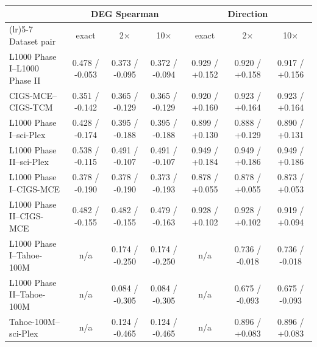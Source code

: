 \begin{table}[t]
\label{tab:dose_threshold_sensitivity}
\centering
\scriptsize
\renewcommand{\arraystretch}{1.15}
\setlength{\tabcolsep}{5pt}
\begin{tabular}{>{\raggedright\arraybackslash}p{3.4cm}@{\hspace{0.8pt}}cccccc}
\toprule
& \multicolumn{3}{c}{DEG Spearman} & \multicolumn{3}{c}{Direction} \\
\cmidrule(lr){2-4} \cmidrule(lr){5-7}
Dataset pair & exact & 2$\times$ & 10$\times$ & exact & 2$\times$ & 10$\times$ \\
\midrule
L1000 Phase I--L1000 Phase II
  & 0.478 / -0.053 & 0.373 / -0.095 & 0.372 / -0.094
  & 0.929 / +0.152 & 0.920 / +0.158 & 0.917 / +0.156 \\
CIGS-MCE--CIGS-TCM
  & 0.351 / -0.142 & 0.365 / -0.129 & 0.365 / -0.129
  & 0.920 / +0.160 & 0.923 / +0.164 & 0.923 / +0.164 \\
L1000 Phase I--sci-Plex
  & 0.428 / -0.174 & 0.395 / -0.188 & 0.395 / -0.188
  & 0.899 / +0.130 & 0.888 / +0.129 & 0.890 / +0.131 \\
L1000 Phase II--sci-Plex
  & 0.538 / -0.115 & 0.491 / -0.107 & 0.491 / -0.107
  & 0.949 / +0.184 & 0.949 / +0.186 & 0.949 / +0.186 \\
L1000 Phase I--CIGS-MCE
  & 0.378 / -0.190 & 0.378 / -0.190 & 0.373 / -0.193
  & 0.878 / +0.055 & 0.878 / +0.055 & 0.873 / +0.053 \\
L1000 Phase II--CIGS-MCE
  & 0.482 / -0.155 & 0.482 / -0.155 & 0.479 / -0.163
  & 0.928 / +0.102 & 0.928 / +0.102 & 0.919 / +0.094 \\
L1000 Phase I--Tahoe-100M
  & n/a & 0.174 / -0.250 & 0.174 / -0.250
  & n/a & 0.736 / -0.018 & 0.736 / -0.018 \\
L1000 Phase II--Tahoe-100M
  & n/a & 0.084 / -0.305 & 0.084 / -0.305
  & n/a & 0.675 / -0.093 & 0.675 / -0.093 \\
Tahoe-100M--sci-Plex
  & n/a & 0.124 / -0.465 & 0.124 / -0.465
  & n/a & 0.896 / +0.083 & 0.896 / +0.083 \\
\bottomrule
\end{tabular}
\end{table}
